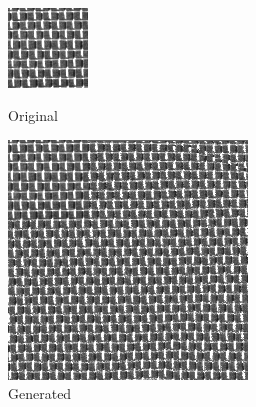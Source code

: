 \documentclass{article}
\begin{document}
\pagebreak \\

    \begin{figure}[!htb]
    \begin{center}
      \includegraphics[scale=.6]{5/report/non_parametric/2.png}
      \caption{Original}
    \end{center}
    \endminipage
    \begin{center}
      \includegraphics[scale=1.0]{5/report/non_parametric/2_created.png}
      \caption{Generated}
    \end{center}
    \endminipage
    \end{figure}
\end{document}
